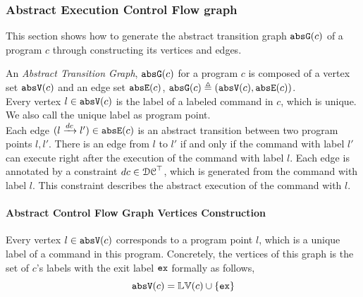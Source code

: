 \subsubsection{Abstract Execution Control Flow graph}
\label{sec:abscfg}
This section shows how to generate the abstract transition graph $\mathtt{abs}{\mathtt{G}}(c)$ of a
program $c$ through constructing its vertices and edges.

An \emph{Abstract Transition Graph}, $\mathtt{abs}{\mathtt{G}}(c)$ for a program $c$ is composed of
a vertex set $\mathtt{abs}{\mathtt{V}}(c)$ and an edge set $\mathtt{abs}{\mathtt{E}}(c)$, $\mathtt{abs}{\mathtt{G}}(c) \triangleq (\mathtt{abs}{\mathtt{V}}(c), \mathtt{abs}{\mathtt{E}}(c))$.
%
\\
Every 
vertex $l \in \mathtt{abs}{\mathtt{V}}(c)$ is the label of a labeled command in $c$, which is unique.
We also call the unique label as program point.
\\
Each edge $(l \xrightarrow{dc} l') \in \mathtt{abs}{\mathtt{E}}(c)$ is an abstract transition
between two program points $l, l'$. 
There is an edge from $l$ to $l'$ if and only if
the command with label $l'$ can execute right after the execution of the command with label $l$.
Each edge is annotated by a constraint $dc \in \mathcal{DC}^{\top}$, which is generated from the command with label $l$.
This constraint describes the abstract execution of the command with $l$. 

\paragraph{Abstract Control Flow Graph Vertices Construction}
\label{sec:abscfg-vertex}
Every 
vertex $l \in \mathtt{abs}{\mathtt{V}}(c)$ corresponds to a program point $l$, which is a unique
label of a command in this program.
Concretely,
the vertices of this graph is the set of $c$'s labels with the exit label ${\mathtt{ex}}$ formally as follows,
\[ 
  \mathtt{abs}{\mathtt{V}}(c) = \mathbb{LV}(c)\cup\{{\mathtt{ex}}\}
\]

